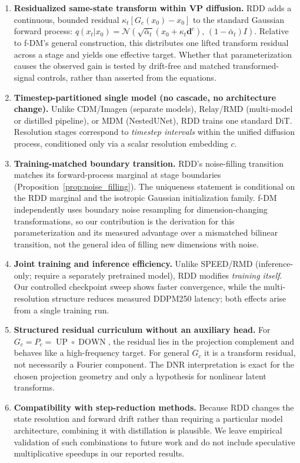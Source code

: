 \documentclass[10pt]{article}
\DeclareMathOperator{\DOWN}{DOWN}
\DeclareMathOperator{\UP}{UP}
\newcommand{\bd}{\bm{d}}
\begin{document}
\begin{enumerate}
\item \textbf{Residualized same-state transform within VP diffusion.}
    RDD adds a continuous, bounded residual $\kappa_t [G_c(x_0)-x_0]$ to the standard Gaussian forward process:
    $q(x_t|x_0) = \mathcal{N}(\sqrt{\bar\alpha_t}(x_0 + \kappa_t \bd^c),\, (1-\bar\alpha_t)I)$.
    Relative to f-DM's general construction, this distributes one lifted transform residual across a stage and yields one effective target. Whether that parameterization causes the observed gain is tested by drift-free and matched transformed-signal controls, rather than asserted from the equations.

\item \textbf{Timestep-partitioned single model (no cascade, no architecture change).}
    Unlike CDM/Imagen (separate models), Relay/RMD (multi-model or distilled pipeline), or MDM (NestedUNet), RDD trains one standard DiT.
    Resolution stages correspond to \emph{timestep intervals} within the unified diffusion process, conditioned only via a scalar resolution embedding $c$.

\item \textbf{Training-matched boundary transition.}
    RDD's noise-filling transition matches its forward-process marginal at stage boundaries (Proposition~\ref{prop:noise_filling}). The uniqueness statement is conditional on the RDD marginal and the isotropic Gaussian initialization family. f-DM independently uses boundary noise resampling for dimension-changing transformations, so our contribution is the derivation for this parameterization and its measured advantage over a mismatched bilinear transition, not the general idea of filling new dimensions with noise.

\item \textbf{Joint training and inference efficiency.}
    Unlike SPEED/RMD (inference-only; require a separately pretrained model), RDD modifies \emph{training itself}. Our controlled checkpoint sweep shows faster convergence, while the multi-resolution structure reduces measured DDPM250 latency; both effects arise from a single training run.

\item \textbf{Structured residual curriculum without an auxiliary head.}
    For $G_c=P_c=\UP\circ\DOWN$, the residual lies in the projection complement and behaves like a high-frequency target. For general $G_c$ it is a transform residual, not necessarily a Fourier component. The DNR interpretation is exact for the chosen projection geometry and only a hypothesis for nonlinear latent transforms.

\item \textbf{Compatibility with step-reduction methods.}
    Because RDD changes the state resolution and forward drift rather than requiring a particular model architecture, combining it with distillation is plausible. We leave empirical validation of such combinations to future work and do not include speculative multiplicative speedups in our reported results.
\end{enumerate}
\end{document}
